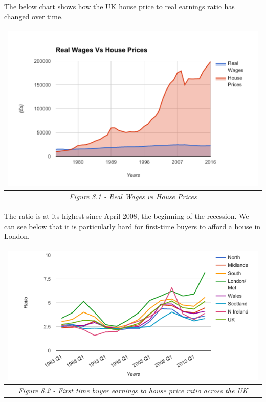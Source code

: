 \documentclass[]{tufte-handout}
\begin{document}
The below chart shows how the UK house price to real earnings ratio has
changed over time.

\begin{longtable}[]{@{}c@{}}
\toprule
\includegraphics{ChapterPictures/8-1-RealWagesvsHousePrices.png}\tabularnewline
\midrule
\endhead
\emph{Figure 8.1 - Real Wages vs House Prices}\tabularnewline
\bottomrule
\end{longtable}

The ratio is at its highest since April 2008, the beginning of the
recession. We can see below that it is particularly hard for first-time
buyers to afford a house in London.

\begin{longtable}[]{@{}c@{}}
\toprule
\begin{minipage}[b]{0.97\columnwidth}\centering
\includegraphics{ChapterPictures/8-2-Firsttimebuyer.png}\strut
\end{minipage}\tabularnewline
\midrule
\endhead
\begin{minipage}[t]{0.97\columnwidth}\centering
\emph{Figure 8.2 - First time buyer earnings to house price ratio across
the UK}\strut
\end{minipage}\tabularnewline
\bottomrule
\end{longtable}
\end{document}
